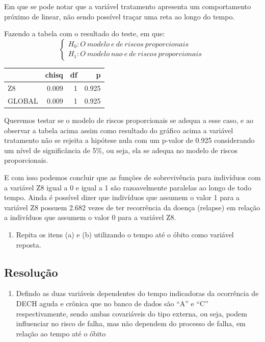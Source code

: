 \documentclass[]{article}
\providecommand{\tightlist}{%
  \setlength{\itemsep}{0pt}\setlength{\parskip}{0pt}}
\begin{document}
Em que se pode notar que a variável tratamento apresenta um
comportamento próximo de linear, não sendo possível traçar uma reta ao
longo do tempo.

Fazendo a tabela com o resultado do teste, em que:
\[ \left\{ \begin{array}{ll}
H_0: O \ modelo \ e \ de \ riscos \ proporcionais \\
H_1: O \ modelo \ nao \ e \ de \ riscos \ proporcionais  \end{array} \right.\ \]

\begin{longtable}[]{@{}lrrr@{}}
\toprule
& chisq & df & p\tabularnewline
\midrule
\endhead
Z8 & 0.009 & 1 & 0.925\tabularnewline
GLOBAL & 0.009 & 1 & 0.925\tabularnewline
\bottomrule
\end{longtable}

Queremos testar se o modelo de riscos proporcionais se adequa a esse
caso, e ao observar a tabela acima assim como resultado do gráfico acima
a variável tratamento não se rejeita a hipótese nula com um p-valor de
0.925 considerando um nível de significância de 5\%, ou seja, ela se
adequa no modelo de riscos proporcionais.

E com isso podemos concluir que as funções de sobrevivência para
indivíduos com a variável Z8 igual a 0 e igual a 1 são razoavelmente
paralelas ao longo de todo tempo. Ainda é possível dizer que indivíduos
que assumem o valor 1 para a variável Z8 possuem 2.682 vezes de ter
recorrência da doença (relapse) em relação a indivíduos que assumem o
valor 0 para a variável Z8.

\begin{enumerate}
\def\labelenumi{(\alph{enumi})}
\setcounter{enumi}{2}
\tightlist
\item
  Repita os itens (a) e (b) utilizando o tempo até o óbito como variável
  reposta.
\end{enumerate}

\subsection{Resolução}\label{resolucao-2}

\begin{enumerate}
\def\labelenumi{\alph{enumi})}
\tightlist
\item
  Defindo as duas variáveis dependentes do tempo indicadoras da
  ocorrência de DECH aguda e crônica que no banco de dados são ``A'' e
  ``C'' respectivamente, sendo ambas covariáveis do tipo externa, ou
  seja, podem influenciar no risco de falha, mas não dependem do
  processo de falha, em relação ao tempo até o óbito
\end{enumerate}
\end{document}
